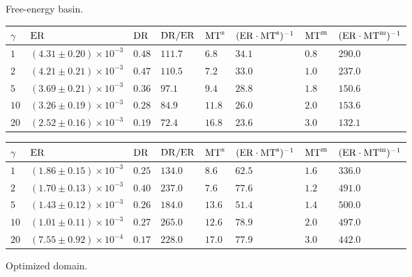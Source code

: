 \begin{figure}[ht]
  \centering
  \small
  \begin{subtable}{0.9\textwidth}
    \centering
    \caption[]{Free-energy basin.}
    \begin{tabular}{l|lllllll}
      \hline
      $\gamma$ & $\mathrm{ER}$ & $\mathrm{DR}$ &  $\mathrm{DR}/\mathrm{ER}$ & $\mathrm{MT}^{\mathrm{s}}$ & $(\mathrm{ER}\cdot\mathrm{MT}^{\mathrm{s}})^{-1}$ & $\mathrm{MT}^{\mathrm{m}}$  & $(\mathrm{ER}\cdot\mathrm{MT}^{\mathrm{m}})^{-1}$ \\
      \hline
$1$ & $(4.31 \pm 0.20) \times 10^{-3}$ & $0.48$ & $111.7$ & $6.8$ & $34.1$ & $0.8$ & $290.0$ \\
$2$ & $(4.21 \pm 0.21) \times 10^{-3}$ & $0.47$ & $110.5$ & $7.2$ & $33.0$ & $1.0$ & $237.0$ \\
$5$ & $(3.69 \pm 0.21) \times 10^{-3}$ & $0.36$ & $97.1$ & $9.4$ & $28.8$ & $1.8$ & $150.6$ \\
$10$ & $(3.26 \pm 0.19) \times 10^{-3}$ & $0.28$ & $84.9$ & $11.8$ & $26.0$ & $2.0$ & $153.6$ \\
$20$ & $(2.52 \pm 0.16) \times 10^{-3}$ & $0.19$ & $72.4$ & $16.8$ & $23.6$ & $3.0$ & $132.1$ \\
      \hline
    \end{tabular}
    \label{03:tab:free_energy_basin}
  \end{subtable}
  \hfill
  \begin{subtable}{0.9\textwidth}
    \centering
    \caption[]{Optimized domain.}
    \begin{tabular}{l|lllllll}
      \hline
      $\gamma$ & $\mathrm{ER}$ & $\mathrm{DR}$ &  $\mathrm{DR}/\mathrm{ER}$ & $\mathrm{MT}^{\mathrm{s}}$ & $(\mathrm{ER}\cdot\mathrm{MT}^{\mathrm{s}})^{-1}$ & $\mathrm{MT}^{\mathrm{m}}$  & $(\mathrm{ER}\cdot\mathrm{MT}^{\mathrm{m}})^{-1}$ \\
      \hline
$1$ & $(1.86 \pm 0.15) \times 10^{-3}$ & $0.25$ & $134.0$ & $8.6$ & $62.5$ & $1.6$ & $336.0$ \\
$2$ & $(1.70 \pm 0.13) \times 10^{-3}$ & $0.40$ & $237.0$ & $7.6$ & $77.6$ & $1.2$ & $491.0$ \\
$5$ & $(1.43 \pm 0.12) \times 10^{-3}$ & $0.26$ & $184.0$ & $13.6$ & $51.4$ & $1.4$ & $500.0$ \\
$10$ & $(1.01 \pm 0.11) \times 10^{-3}$ & $0.27$ & $265.0$ & $12.6$ & $78.9$ & $2.0$ & $497.0$ \\
$20$ & $(7.55 \pm 0.92) \times 10^{-4}$ & $0.17$ & $228.0$ & $17.0$ & $77.9$ & $3.0$ & $442.0$ \\
      \hline
    \end{tabular}
    \label{03:tab:optimized_state}
  \end{subtable}


\end{figure}
